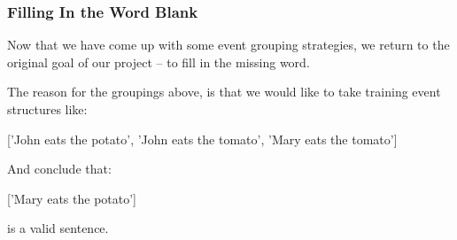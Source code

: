 \documentclass[11pt]{article}
\newenvironment{Shaded}{}{}
\newcommand{\StringTok}[1]{\textcolor[rgb]{0.25,0.44,0.63}{{#1}}}
\newcommand{\NormalTok}[1]{{#1}}
\begin{document}
    \hypertarget{filling-in-the-word-blank}{%
\subsubsection{Filling In the Word
Blank}\label{filling-in-the-word-blank}}

Now that we have come up with some event grouping strategies, we return
to the original goal of our project -- to fill in the missing word.

The reason for the groupings above, is that we would like to take
training event structures like:

\begin{Shaded}
\begin{Highlighting}[]
\NormalTok{[}\StringTok{'John eats the potato'}\NormalTok{, }\StringTok{'John eats the tomato'}\NormalTok{, }\StringTok{'Mary eats the tomato'}\NormalTok{]}
\end{Highlighting}
\end{Shaded}

And conclude that:

\begin{Shaded}
\begin{Highlighting}[]
\NormalTok{[}\StringTok{'Mary eats the potato'}\NormalTok{]}
\end{Highlighting}
\end{Shaded}

is a valid sentence.
\end{document}
